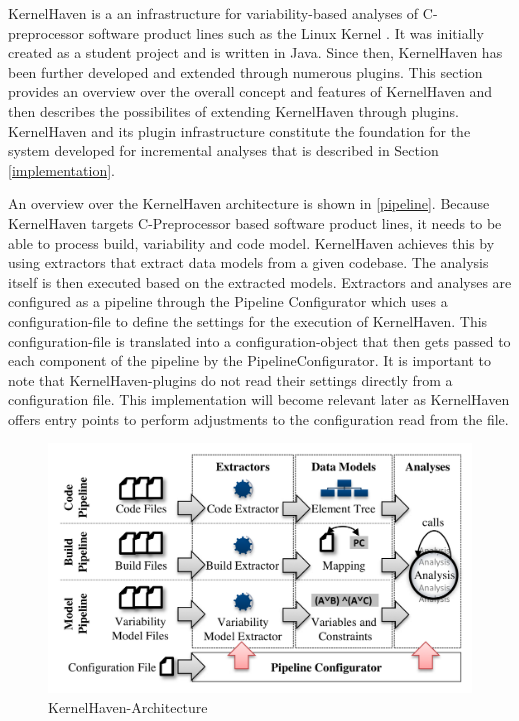 \documentclass[a4paper]{article}
\begin{document}
KernelHaven is a an infrastructure for variability-based analyses of C-preprocessor software product lines such as the Linux Kernel \cite{KroeherEl-SharkawySchmid18}. It was initially created as a student project and is written in Java.  Since then, KernelHaven has been further developed and extended through numerous plugins. This section  provides an overview over the overall concept and features of KernelHaven and then describes the possibilites of extending KernelHaven through plugins. KernelHaven and its plugin infrastructure constitute the foundation for the system developed for incremental analyses that is described in Section \ref{implementation}. 

An overview over the KernelHaven architecture is shown in \autoref{pipeline}. Because KernelHaven targets C-Preprocessor based software product lines, it needs to be able to process build, variability and code model. KernelHaven achieves this by using extractors that extract data models from a given codebase. The analysis itself is then executed based on the extracted models. Extractors and analyses are configured as a pipeline through the Pipeline Configurator which uses a configuration-file to define the settings for the execution of KernelHaven. This configuration-file is translated into a configuration-object that then gets passed to each component of the pipeline by the PipelineConfigurator. It is  important to note that KernelHaven-plugins do not read their settings directly from a configuration file. This implementation will become relevant later as KernelHaven offers entry points to perform adjustments to the configuration read from the file.

\begin{figure}[h] 
  \centering
  \begin{minipage}[b]{1\textwidth} 
    \caption[KernelHaven-Pipeline]{KernelHaven-Architecture \cite{KroeherEl-SharkawySchmid18}}\label{pipeline}
    \includegraphics[width=1\textwidth]{img/KernelHaven-Pipeline.png}
  \end{minipage}
\end{figure}
\end{document}
